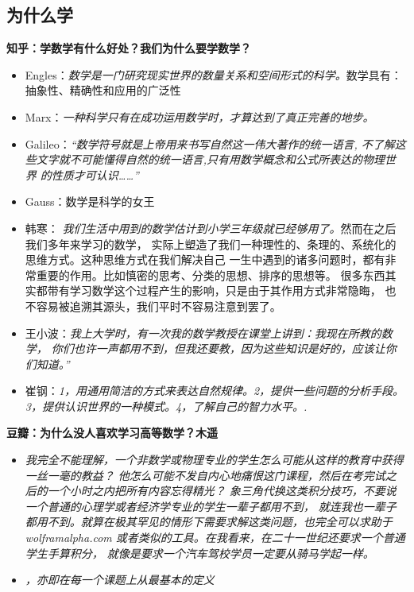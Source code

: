 \subsection{为什么学}

\begin{shaded}
	{\bf 知乎：学数学有什么好处？我们为什么要学数学？}
	\begin{itemize}
	  \item Engles：{\it 数学是一门研究现实世界的数量关系和空间形式的科学。}数学具有：
	  抽象性、精确性和应用的广泛性
	  \item Marx：{\it 一种科学只有在成功运用数学时，才算达到了真正完善的地步。}
	  \item Galileo：{\it “数学符号就是上帝用来书写自然这一伟大著作的统一语言,
	  不了解这些文字就不可能懂得自然的统一语言,只有用数学概念和公式所表达的物理世界
	  的性质才可认识……”}
	  \item Gauss：{数学是科学的女王}
	  \item 韩寒：{\it
	  我们生活中用到的数学估计到小学三年级就已经够用了。}然而在之后我们多年来学习的数学，
	  实际上塑造了我们一种理性的、条理的、系统化的思维方式。这种思维方式在我们解决自己
	  一生中遇到的诸多问题时，都有非常重要的作用。比如慎密的思考、分类的思想、排序的思想等。
	  很多东西其实都带有学习数学这个过程产生的影响，只是由于其作用方式非常隐晦，
	  也不容易被追溯其源头，我们平时不容易注意到罢了。
	  \item 王小波：{\it 我上大学时，有一次我的数学教授在课堂上讲到：我现在所教的数学，
	  你们也许一声都用不到，但我还要教，因为这些知识是好的，应该让你们知道。”}
	  \item 崔钢：{\it 1，用通用简洁的方式来表达自然规律。2，提供一些问题的分析手段。
	  3，提供认识世界的一种模式。4，了解自己的智力水平。.}
	\end{itemize}
	{\bf 豆瓣：为什么没人喜欢学习高等数学？木遥}
	\begin{itemize}
	  \item {\it 我完全不能理解，一个非数学或物理专业的学生怎么可能从这样的教育中获得一丝一毫的教益？
	  他怎么可能不发自内心地痛恨这门课程，然后在考完试之后的一个小时之内把所有内容忘得精光？
	  象三角代换这类积分技巧，不要说一个普通的心理学或者经济学专业的学生一辈子都用不到，
	  就连我也一辈子都用不到。就算在极其罕见的情形下需要求解这类问题，也完全可以求助于
	  wolframalpha.com 或者类似的工具。在我看来，在二十一世纪还要求一个普通学生手算积分，
	  就像是要求一个汽车驾校学员一定要从骑马学起一样。}
	  \item {\it {}，亦即在每一个课题上从最基本的定义
}
\end{itemize}
\end{shaded}

